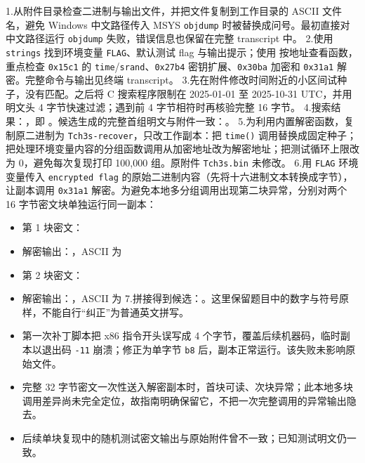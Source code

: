 1.从附件目录检查二进制与输出文件，并把文件复制到工作目录的 ASCII 文件名，避免 Windows 中文路径传入 MSYS \texttt{objdump} 时被替换成问号。最初直接对中文路径运行 \texttt{objdump} 失败，错误信息也保留在完整 transcript 中。 2.使用 \texttt{strings} 找到环境变量 \texttt{FLAG}、默认测试 flag 与输出提示；使用 \texttt{} 按地址查看函数，重点检查 \texttt{0x15c1} 的 \texttt{time}/\texttt{srand}、\texttt{0x27b4} 密钥扩展、\texttt{0x30ba} 加密和 \texttt{0x31a1} 解密。完整命令与输出见终端 transcript。 3.先在附件修改时间附近的小区间试种子，没有匹配。之后将 C 搜索程序限制在 2025-01-01 至 2025-10-31 UTC，并用明文头 4 字节快速过滤；遇到前 4 字节相符时再核验完整 16 字节。 4.搜索结果：\texttt{}，即 \texttt{}。候选生成的完整首组明文与附件一致：\texttt{}。 5.为利用内置解密函数，复制原二进制为 \texttt{Tch3s-recover}，只改工作副本：把 \texttt{time()} 调用替换成固定种子；把处理环境变量内容的分组函数调用从加密地址改为解密地址；把测试循环上限改为 0，避免每次复现打印 100,000 组。原附件 \texttt{Tch3s.bin} 未修改。 6.用 \texttt{FLAG} 环境变量传入 \texttt{encrypted\ flag} 的原始二进制内容（先将十六进制文本转换成字节），让副本调用 \texttt{0x31a1} 解密。为避免本地多分组调用出现第二块异常，分别对两个 16 字节密文块单独运行同一副本：

\begin{itemize}
\item
  第 1 块密文：\texttt{}
\item
  解密输出：\texttt{}，ASCII 为 \texttt{}
\item
  第 2 块密文：\texttt{}
\item
  解密输出：\texttt{}，ASCII 为 \texttt{} 7.拼接得到候选：\texttt{}。这里保留题目中的数字与符号原样，不能自行``纠正''为普通英文拼写。
\item
  第一次补丁脚本把 x86 指令开头误写成 4 个字节，覆盖后续机器码，临时副本以退出码 \texttt{-11} 崩溃；修正为单字节 \texttt{b8} 后，副本正常运行。该失败未影响原始文件。
\item
  完整 32 字节密文一次性送入解密副本时，首块可读、次块异常；此本地多块调用差异尚未完全定位，故指南明确保留它，不把一次完整调用的异常输出隐去。
\item
  后续单块复现中的随机测试密文输出与原始附件曾不一致；已知测试明文仍一致。
\end{itemize}

